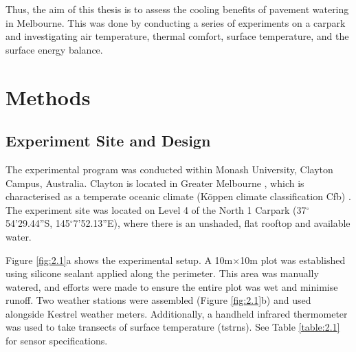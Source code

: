 \documentclass[final,3p,times,authoryear]{elsarticle}
\begin{document}
Thus, the aim of this thesis is to assess the cooling benefits of pavement watering in Melbourne. This was done by conducting a series of experiments on a carpark and investigating air temperature, thermal comfort, surface temperature, and the surface energy balance.

\section{Methods}\label{sec:methods2}
\subsection{Experiment Site and Design}\label{sec:methods2.1}

The experimental program was conducted within Monash University, Clayton Campus, Australia. Clayton is located in Greater Melbourne , which is characterised as a temperate oceanic climate (K\"{o}ppen climate classification Cfb) \citep{Beck2018}. The experiment site was located on Level 4 of the North 1 Carpark (37$^{\circ}$54'29.44''S, 145$^{\circ}$7'52.13''E), where there is an unshaded, flat rooftop and available water.

Figure \ref{fig:2.1}a shows the experimental setup. A 10m$\times$10m plot was established using silicone sealant applied along the perimeter. This area was manually watered, and efforts were made to ensure the entire plot was wet and minimise runoff. Two weather stations were assembled (Figure \ref{fig:2.1}b) and used alongside Kestrel weather meters. Additionally, a handheld infrared thermometer was used to take transects of surface temperature (\gls{tstrns}). See Table \ref{table:2.1} for sensor specifications.
\end{document}
